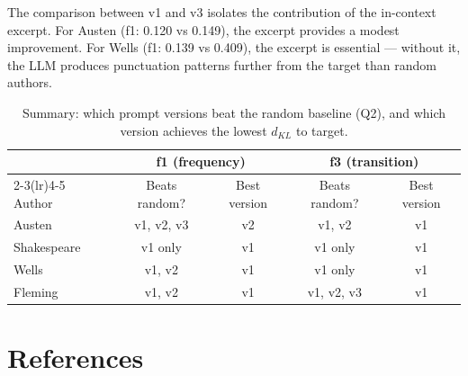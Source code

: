 \documentclass{article}
\begin{document}
The comparison between v1 and v3 isolates the contribution of the in-context excerpt. For Austen (f1: 0.120 vs 0.149), the excerpt provides a modest improvement. For Wells (f1: 0.139 vs 0.409), the excerpt is essential --- without it, the LLM produces punctuation patterns further from the target than random authors.

\begin{table}[htbp]
\centering
\begin{tabular}{lcccc}
\toprule
 & \multicolumn{2}{c}{f1 (frequency)} & \multicolumn{2}{c}{f3 (transition)} \\
\cmidrule(lr){2-3}\cmidrule(lr){4-5}
Author & Beats random? & Best version & Beats random? & Best version \\
\midrule
Austen    & v1, v2, v3 & v2 & v1, v2 & v1 \\
Shakespeare & v1 only & v1 & v1 only & v1 \\
Wells     & v1, v2 & v1 & v1 only & v1 \\
Fleming   & v1, v2 & v1 & v1, v2, v3 & v1 \\
\bottomrule
\end{tabular}
\caption{Summary: which prompt versions beat the random baseline (Q2), and which version achieves the lowest $d_{KL}$ to target.}
\label{tab:v_summary}
\end{table}

\section*{References}
\end{document}
